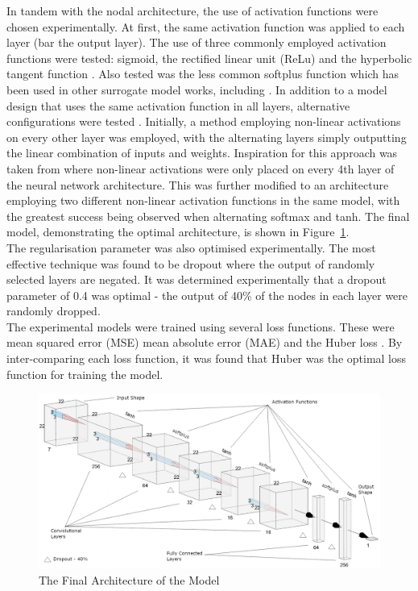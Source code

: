 \noindent
In tandem with the nodal architecture, the use of activation functions were chosen experimentally. At first, the same activation function was applied to each layer (bar the output layer). The use of three commonly employed activation functions were tested: sigmoid, the rectified linear unit (ReLu) \cite{hara2015analysis} and the hyperbolic tangent function \cite{kalman1992tanh}. Also tested was the less common softplus function \cite{zheng2015improving} which has been used in other surrogate model works, including \cite{liang2018deep}. In addition to a model design that uses the same activation function in all layers, alternative configurations were tested . Initially, a method employing non-linear activations on every other layer was employed, with the alternating layers simply outputting the linear combination of inputs and weights. Inspiration for this approach was taken from \cite{ahn2020deep} where non-linear activations were only placed on every 4th layer of the neural network architecture. This was further modified to an architecture employing two different non-linear activation functions in the same model, with the greatest success being observed when alternating softmax and tanh. The final model, demonstrating the optimal architecture, is shown in Figure~\ref{fig:model_architecture}.
\\

\noindent
The regularisation parameter was also optimised experimentally. The most effective technique was found to be dropout \cite{srivastava2014dropout} where the output of randomly selected layers are negated. It was determined experimentally that a dropout parameter of 0.4 was optimal - the output of 40\% of the nodes in each layer were randomly dropped. 
\\

\noindent
The experimental models were trained using several loss functions. These were mean squared error (MSE) mean absolute error (MAE) and the Huber loss \cite{huber1964robust}. By inter-comparing each loss function, it was found that Huber was the optimal loss function for training the model.


\begin{figure}[h]
	\centering
	\includegraphics[scale=1.2]{Figures/architecture_final.png}
	\caption{The Final Architecture of the Model}
	\label{fig:model_architecture}
\end{figure} 

